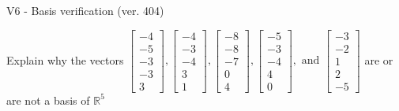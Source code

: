 \begin{exercise}
  \begin{exerciseTitle}V6 - Basis verification (ver. 404)\end{exerciseTitle}
  \begin{exerciseStatement}
    Explain why the vectors \(\left[\begin{array}{r}
-4 \\
-5 \\
-3 \\
-3 \\
3
\end{array}\right] , \left[\begin{array}{r}
-4 \\
-3 \\
-4 \\
3 \\
1
\end{array}\right] , \left[\begin{array}{r}
-8 \\
-8 \\
-7 \\
0 \\
4
\end{array}\right] , \left[\begin{array}{r}
-5 \\
-3 \\
-4 \\
4 \\
0
\end{array}\right] , \text{ and } \left[\begin{array}{r}
-3 \\
-2 \\
1 \\
2 \\
-5
\end{array}\right]\) are or are not a basis of \(\mathbb{R}^5\)	



\end{exerciseStatement}
\end{exercise}
